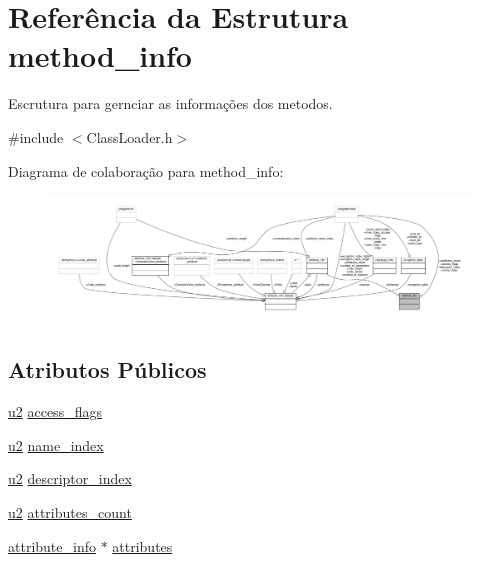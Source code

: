 \hypertarget{structmethod__info}{}\section{Referência da Estrutura method\+\_\+info}
\label{structmethod__info}


Escrutura para gernciar as informações dos metodos.  




{\ttfamily \#include $<$Class\+Loader.\+h$>$}



Diagrama de colaboração para method\+\_\+info\+:\nopagebreak
\begin{figure}[H]
\begin{center}
\leavevmode
\includegraphics[width=350pt]{structmethod__info__coll__graph}
\end{center}
\end{figure}
\subsection*{Atributos Públicos}
\begin{DoxyCompactItemize}
\item 
\hyperlink{ClassLoader_8h_a5f223212eef04d10a4550ded680cb1cf}{u2} \hyperlink{structmethod__info_a3b657027a141cdbc94ded28607c98be5}{access\+\_\+flags}
\item 
\hyperlink{ClassLoader_8h_a5f223212eef04d10a4550ded680cb1cf}{u2} \hyperlink{structmethod__info_ab91d62d0658b77bba83f6bb685e3bbb9}{name\+\_\+index}
\item 
\hyperlink{ClassLoader_8h_a5f223212eef04d10a4550ded680cb1cf}{u2} \hyperlink{structmethod__info_a7713103e0c8d060630ad62774fb9be37}{descriptor\+\_\+index}
\item 
\hyperlink{ClassLoader_8h_a5f223212eef04d10a4550ded680cb1cf}{u2} \hyperlink{structmethod__info_ad9e5e1e2fc850806addadd6deab8565d}{attributes\+\_\+count}
\item 
\hyperlink{structattribute__info}{attribute\+\_\+info} $\ast$ \hyperlink{structmethod__info_a8ce4caaa03680c91f548558a38647ad8}{attributes}
\end{DoxyCompactItemize}


